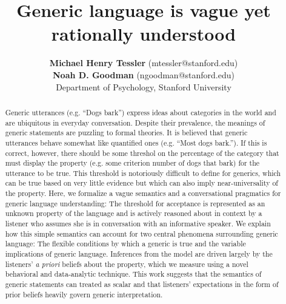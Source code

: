 \documentclass[10pt,letterpaper]{article}
\title{Generic language is vague yet rationally understood}
\author{{\large \bf Michael Henry Tessler} (mtessler@stanford.edu)\\ {\large \bf Noah D. Goodman} (ngoodman@stanford.edu) \\
  Department of Psychology, Stanford University}
\begin{document}
\maketitle


\begin{abstract}
Generic utterances (e.g. ``Dogs bark'') express ideas about categories in the world and are ubiquitous in everyday conversation. 
Despite their prevalence, the meanings of generic statements are puzzling to formal theories. 
It is believed that generic utterances behave somewhat like quantified ones (e.g. ``Most dogs bark.''). 
If this is correct, however, there should be some threshol on the percentage of the category that must display the property (e.g. some criterion number of dogs that bark) for the utterance to be true.
This threshold is notoriously difficult to define for generics, which can be true based on very little evidence but which can also imply near-universality of the property. 
Here, we formalize a vague semantics and a conversational pragmatics for generic language understanding: The threshold for acceptance is represented as an unknown property of the language and is actively reasoned about in context by a listener who assumes she is in conversation with an informative speaker. 
We explain how this simple semantics can account for two central phenomena surrounding generic language: The flexible conditions by which a generic is true and the variable implications of generic language. 
Inferences from the model are driven largely by the listeners' \emph{a priori} beliefs about the property, which we measure using a novel behavioral and data-analytic technique.
This work suggests that the semantics of generic statements can treated as scalar and that listeners' expectations in the form of prior beliefs heavily govern generic interpretation. 



\end{abstract}
\end{document}
